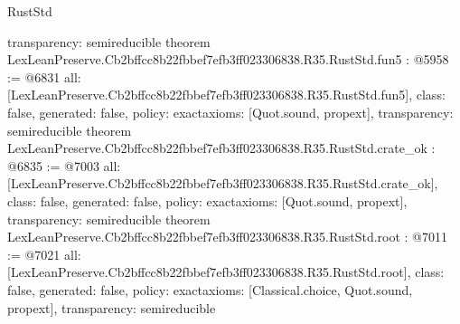 \begin{lexlean}{RustStd}
\begin{coremodule}
{  transparency: semireducible
}
theorem LexLeanPreserve.Cb2bffcc8b22fbbef7efb3ff023306838.R35.RustStd.fun5 : @5958 := @6831 {
  all: [LexLeanPreserve.Cb2bffcc8b22fbbef7efb3ff023306838.R35.RustStd.fun5],
  class: false,
  generated: false,
  policy: exact{axioms: [Quot.sound, propext]},
  transparency: semireducible
}
theorem LexLeanPreserve.Cb2bffcc8b22fbbef7efb3ff023306838.R35.RustStd.crate_ok : @6835 := @7003 {
  all: [LexLeanPreserve.Cb2bffcc8b22fbbef7efb3ff023306838.R35.RustStd.crate_ok],
  class: false,
  generated: false,
  policy: exact{axioms: [Quot.sound, propext]},
  transparency: semireducible
}
theorem LexLeanPreserve.Cb2bffcc8b22fbbef7efb3ff023306838.R35.RustStd.root : @7011 := @7021 {
  all: [LexLeanPreserve.Cb2bffcc8b22fbbef7efb3ff023306838.R35.RustStd.root],
  class: false,
  generated: false,
  policy: exact{axioms: [Classical.choice, Quot.sound, propext]},
  transparency: semireducible
}


\end{coremodule}
\end{lexlean}
